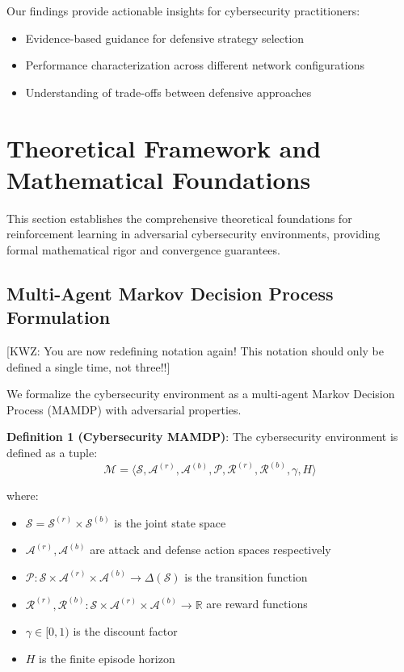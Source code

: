 \documentclass[12pt,oneside]{article}
\newcommand{\kwz}[1]{
  {\color{magenta} [KWZ: {#1}]}
 }
\begin{document}
Our findings provide actionable insights for cybersecurity practitioners:
\begin{itemize}
    \item Evidence-based guidance for defensive strategy selection
    \item Performance characterization across different network configurations
    \item Understanding of trade-offs between defensive approaches
\end{itemize}

\section{Theoretical Framework and Mathematical Foundations}

This section establishes the comprehensive theoretical foundations for reinforcement learning in adversarial cybersecurity environments, providing formal mathematical rigor and convergence guarantees.

\subsection{Multi-Agent Markov Decision Process Formulation}

\kwz{You are now redefining notation again! This notation should only be defined a single time, not three!!}

We formalize the cybersecurity environment as a multi-agent Markov Decision Process (MAMDP) with adversarial properties.

\textbf{Definition 1 (Cybersecurity MAMDP)}: The cybersecurity environment is defined as a tuple:
\begin{equation}
\mathcal{M} = \langle \mathcal{S}, \mathcal{A}^{(r)}, \mathcal{A}^{(b)}, \mathcal{P}, \mathcal{R}^{(r)}, \mathcal{R}^{(b)}, \gamma, H \rangle
\end{equation}

where:
\begin{itemize}
    \item $\mathcal{S} = \mathcal{S}^{(r)} \times \mathcal{S}^{(b)}$ is the joint state space
    \item $\mathcal{A}^{(r)}, \mathcal{A}^{(b)}$ are attack and defense action spaces respectively
    \item $\mathcal{P}: \mathcal{S} \times \mathcal{A}^{(r)} \times \mathcal{A}^{(b)} \rightarrow \Delta(\mathcal{S})$ is the transition function
    \item $\mathcal{R}^{(r)}, \mathcal{R}^{(b)}: \mathcal{S} \times \mathcal{A}^{(r)} \times \mathcal{A}^{(b)} \rightarrow \mathbb{R}$ are reward functions
    \item $\gamma \in [0,1)$ is the discount factor
    \item $H$ is the finite episode horizon
\end{itemize}
\end{document}
